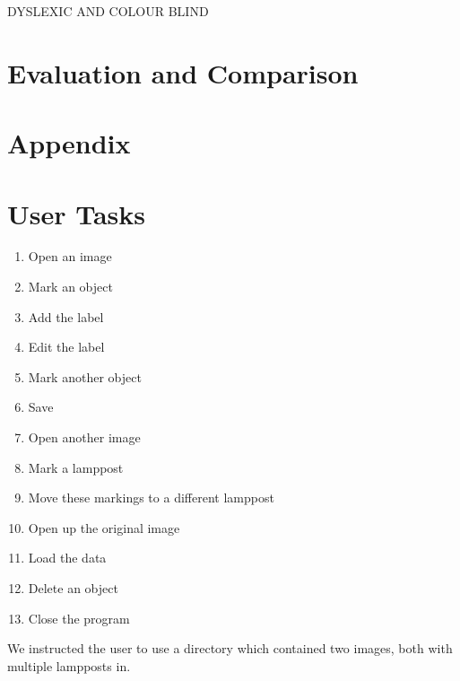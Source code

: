 \documentclass[a4paper,11pt,oneside]{article}
\begin{document}
DYSLEXIC AND COLOUR BLIND

\section{Evaluation and Comparison}

\newpage
\section{Appendix}
\appendix

\section{User Tasks}
\label{sec:tasks}

\begin{enumerate}
\item Open an image
\item Mark an object
\item Add the label
\item Edit the label
\item Mark another object
\item Save
\item Open another image
\item Mark a lamppost
\item Move these markings to a different lamppost
\item Open up the original image
\item Load the data
\item Delete an object
\item Close the program
\end{enumerate}

We instructed the user to use a directory which contained two images, both with multiple lampposts in.
\end{document}
